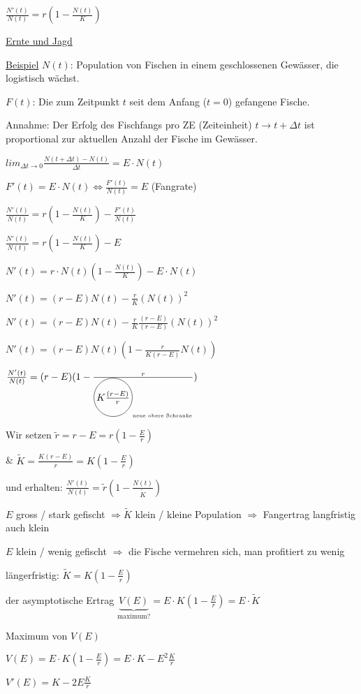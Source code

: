 \documentclass[18pt,a4paper]{scrreprt}
\newcommand*\circled[1]{\tikz[baseline=(char.base)]{
            \node[shape=circle,draw,inner sep=1pt] (char) {#1};}}
\begin{document}
$\frac{N'(t)}{N(t)} = r (1 - \frac{N(t)}{K})$

\uline{Ernte und Jagd}

\uline{Beispiel} $N(t)$: Population von Fischen in einem geschlossenen Gewässer, die logistisch wächst.

$F(t)$: Die zum Zeitpunkt $t$ seit dem Anfang ($t=0$) gefangene Fische.

Annahme: Der Erfolg des Fischfangs pro ZE (Zeiteinheit) $t \rightarrow t + \Delta t$ ist proportional zur aktuellen Anzahl der Fische im Gewässer.

$lim_{\Delta t \to 0}\frac{N(t+\Delta t) - N(t)}{\Delta t} = E \cdot N(t)$

$F'(t) = E \cdot N(t) \Leftrightarrow \frac{F'(t)}{N(t)} = E$ (Fangrate)

$\frac{N'(t)}{N(t)} = r (1 - \frac{N(t)}{K}) - \frac{F'(t)}{N(t)}$

$\frac{N'(t)}{N(t)} = r (1 - \frac{N(t)}{K}) - E$

$N'(t) = r\cdot N(t) (1-\frac{N(t)}{K}) - E\cdot N(t)$

$N'(t) = (r-E) N(t) - \frac{r}{K} (N(t))^2$

$N'(t) = (r-E) N(t) - \frac{r}{K} \frac{(r-E)}{(r-E)} (N(t))^2$

$N'(t) = (r-E) N(t)(1-\frac{r}{K(r-E)}N(t))$

$\frac{N'(t)}{N(t)} = (r-E)(1-\frac{r}{\circled{$K\frac{(r-E)}{r}$}_{\text{neue obere Schranke}}})$

Wir setzen $\tilde{r} = r - E = r (1- \frac{E}{r})$

\& $\tilde{K} = \frac{K(r-E)}{r} = K(1-\frac{E}{r})$

und erhalten: $\frac{N'(t)}{N(t)} = \tilde{r} (1-\frac{N(t)}{\tilde{K}})$

$E$ gross / stark gefischt $\Rightarrow \tilde{K}$ klein / kleine Population $\Rightarrow$ Fangertrag langfristig auch klein

$E$ klein / wenig gefischt $\Rightarrow$ die Fische vermehren sich, man profitiert zu wenig

längerfristig: $\tilde{K} = K(1-\frac{E}{r})$

der asymptotische Ertrag $\underbrace{V(E)}_{\text{maximum?}} = E\cdot K(1-\frac{E}{r}) = E \cdot \tilde{K}$

Maximum von $V(E)$

$V(E) = E\cdot K(1-\frac{E}{r}) = E\cdot K - E^2 \frac{K}{r}$

$V'(E) = K - 2E \frac{K}{r}$
\end{document}
